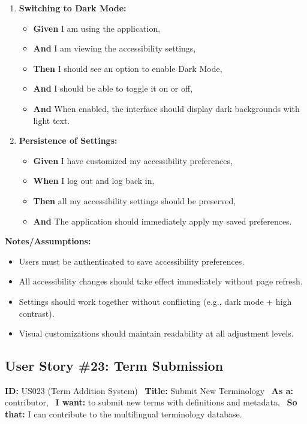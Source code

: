 \documentclass[12pt]{article}
\begin{document}
\begin{enumerate}
    \item \textbf{Switching to Dark Mode:}
    \begin{itemize}
        \item \textbf{Given} I am using the application,
        \item \textbf{And} I am viewing the accessibility settings,
        \item \textbf{Then} I should see an option to enable Dark Mode,
        \item \textbf{And} I should be able to toggle it on or off,
        \item \textbf{And} When enabled, the interface should display dark backgrounds with light text.
    \end{itemize}

    \item \textbf{Persistence of Settings:}
    \begin{itemize}
        \item \textbf{Given} I have customized my accessibility preferences,
        \item \textbf{When} I log out and log back in,
        \item \textbf{Then} all my accessibility settings should be preserved,
        \item \textbf{And} The application should immediately apply my saved preferences.
    \end{itemize}
\end{enumerate}

\vspace{1em}
\textbf{Notes/Assumptions:}
\begin{itemize}
    \item Users must be authenticated to save accessibility preferences.
    \item All accessibility changes should take effect immediately without page refresh.
    \item Settings should work together without conflicting (e.g., dark mode + high contrast).
    \item Visual customizations should maintain readability at all adjustment levels.
\end{itemize}

\subsection{User Story \#23: Term Submission}
\textbf{ID:} US023 (Term Addition System) \
\textbf{Title:} Submit New Terminology \
\textbf{As a:} contributor, \
\textbf{I want:} to submit new terms with definitions and metadata, \
\textbf{So that:} I can contribute to the multilingual terminology database.
\end{document}
